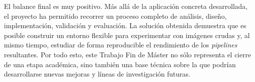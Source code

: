El balance final es muy positivo. Más allá de la aplicación concreta desarrollada, el proyecto ha permitido
recorrer un proceso completo de análisis, diseño, implementación, validación y evaluación. La solución
obtenida demuestra que es posible construir un entorno flexible para experimentar con imágenes crudas y,
al mismo tiempo, estudiar de forma reproducible el rendimiento de los \textit{pipelines} resultantes. Por
todo esto, este Trabajo Fin de Máster no sólo representa el cierre de una etapa académica, sino también una
base técnica sobre la que podrían desarrollarse nuevas mejoras y líneas de investigación futuras.

